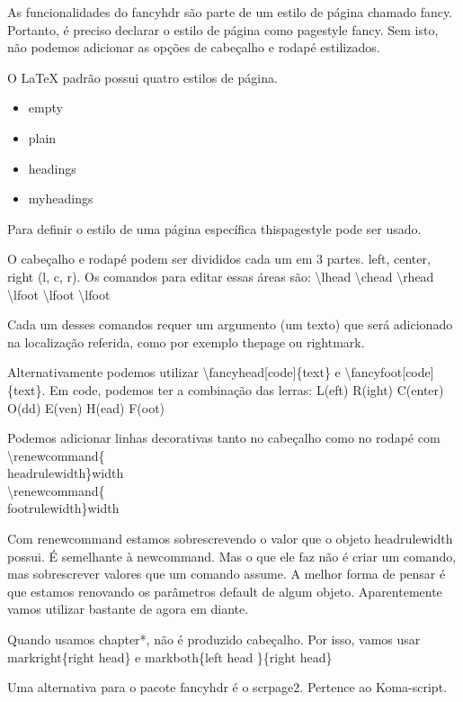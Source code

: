 As funcionalidades do fancyhdr são parte de um estilo de página chamado fancy.
Portanto, é preciso declarar o estilo de página como pagestyle fancy.
Sem isto, não podemos adicionar as opções de cabeçalho e rodapé estilizados.

O LaTeX padrão possui quatro estilos de página.
\begin{itemize}
    \item empty
    \item plain
    \item headings
    \item myheadings
\end{itemize}

Para definir o estilo de uma página específica thispagestyle pode ser usado.

O cabeçalho e rodapé podem ser divididos cada um em 3 partes.
left, center, right (l, c, r).
Os comandos para editar essas áreas são:
\textbackslash lhead \textbackslash chead \textbackslash rhead 
\textbackslash lfoot \textbackslash lfoot \textbackslash lfoot 

Cada um desses comandos requer um argumento (um texto) que será adicionado
na localização referida, como por exemplo thepage ou rightmark.

Alternativamente podemos utilizar \textbackslash fancyhead[code]\{text\} e
\textbackslash fancyfoot[code]\{text\}.
Em code, podemos ter a combinação das lerras:
L(eft) R(ight) C(enter) O(dd) E(ven) H(ead) F(oot)

Podemos adicionar linhas decorativas tanto no cabeçalho como no rodapé com\\
\textbackslash renewcommand\{\\headrulewidth\}{width}\\
\textbackslash renewcommand\{\\footrulewidth\}{width}

Com renewcommand estamos sobrescrevendo o valor que o objeto headrulewidth possui.
É semelhante à newcommand.
Mas o que ele faz não é criar um comando, mas sobrescrever valores que um comando assume.
A melhor forma de pensar é que estamos renovando os parâmetros default de algum objeto.
Aparentemente vamos utilizar bastante de agora em diante.

Quando usamos chapter*, não é produzido cabeçalho.
Por isso, vamos usar \\
markright\{right head\} e markboth\{left head \}\{right head\}

Uma alternativa para o pacote fancyhdr é o scrpage2.
Pertence ao Koma-script.

